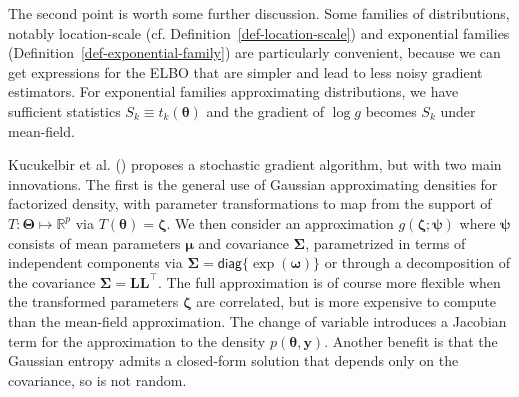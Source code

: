 \documentclass[
  11pt,
  letterpaper,
]{scrbook}
\theoremstyle{definition}
\theoremstyle{plain}
\theoremstyle{plain}
\theoremstyle{plain}
\theoremstyle{definition}
\theoremstyle{definition}
\theoremstyle{plain}
\theoremstyle{plain}
\theoremstyle{remark}
\begin{document}
The second point is worth some further discussion. Some families of
distributions, notably location-scale (cf.
Definition~\ref{def-location-scale}) and exponential families
(Definition~\ref{def-exponential-family}) are particularly convenient,
because we can get expressions for the ELBO that are simpler and lead to
less noisy gradient estimators. For exponential families approximating
distributions, we have sufficient statistics
\(S_k \equiv t_k(\boldsymbol{\theta})\) and the gradient of \(\log g\)
becomes \(S_k\) under mean-field.

Kucukelbir et al. () proposes a
stochastic gradient algorithm, but with two main innovations. The first
is the general use of Gaussian approximating densities for factorized
density, with parameter transformations to map from the support of
\(T: \boldsymbol{\Theta} \mapsto \mathbb{R}^p\) via
\(T(\boldsymbol{\theta})=\boldsymbol{\zeta}.\) We then consider an
approximation \(g(\boldsymbol{\zeta}; \boldsymbol{\psi})\) where
\(\boldsymbol{\psi}\) consists of mean parameters \(\boldsymbol{\mu}\)
and covariance \(\boldsymbol{\Sigma}\), parametrized in terms of
independent components via
\(\boldsymbol{\Sigma}=\mathsf{diag}\{\exp(\boldsymbol{\omega})\}\) or
through a decomposition of the covariance
\(\boldsymbol{\Sigma} = \mathbf{LL}^\top\). The full approximation is of
course more flexible when the transformed parameters
\(\boldsymbol{\zeta}\) are correlated, but is more expensive to compute
than the mean-field approximation. The change of variable introduces a
Jacobian term for the approximation to the density
\(p(\boldsymbol{\theta}, \boldsymbol{y}).\) Another benefit is that the
Gaussian entropy admits a closed-form solution that depends only on the
covariance, so is not random.
\end{document}
